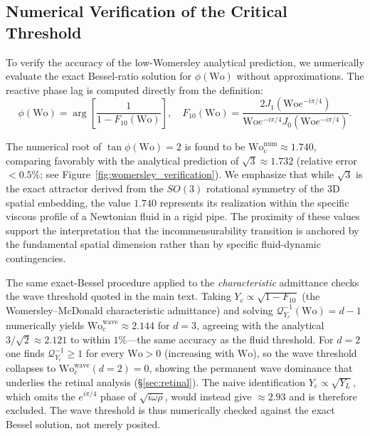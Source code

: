 \documentclass[11pt,a4paper]{article}
\theoremstyle{remark}
\begin{document}
\subsection{Numerical Verification of the Critical Threshold}

To verify the accuracy of the low-Womersley analytical prediction, we
numerically evaluate the exact Bessel-ratio solution for $\phi(\mathrm{Wo})$
without approximations. The reactive phase lag is computed directly from the
definition:
\begin{equation}
    \phi(\mathrm{Wo}) = \arg \left[ \frac{1}{1 - F_{10}(\mathrm{Wo})} \right], \quad F_{10}(\mathrm{Wo}) = \frac{2 J_1(\mathrm{Wo} e^{-i\pi/4})}{\mathrm{Wo} e^{-i\pi/4} J_0(\mathrm{Wo} e^{-i\pi/4})}.
\end{equation}

The numerical root of $\tan \phi(\mathrm{Wo}) = 2$ is found to be
$\mathrm{Wo}_c^{\text{num}} \approx 1.740$, comparing favorably with the
analytical prediction of $\sqrt{3} \approx 1.732$ (relative error $< 0.5\%$; see
Figure~\ref{fig:womersley_verification}). We emphasize that while $\sqrt{3}$ is
the exact attractor derived from the $SO(3)$ rotational symmetry of the 3D
spatial embedding, the value $1.740$ represents its realization within the
specific viscous profile of a Newtonian fluid in a rigid pipe. The proximity of
these values support the interpretation that the incommensurability
transition is anchored by the fundamental spatial dimension rather than by
specific fluid-dynamic contingencies.

The same exact-Bessel procedure applied to the \emph{characteristic}
admittance checks the wave threshold quoted in the main text. Taking $Y_c
\propto \sqrt{1-F_{10}}$ (the Womersley--McDonald characteristic admittance) and
solving $\mathcal{Q}^{-1}_{Y_c}(\mathrm{Wo}) = d-1$ numerically yields
$\mathrm{Wo}_c^{\mathrm{wave}} \approx 2.144$ for $d=3$, agreeing with the
analytical $3/\sqrt{2}\approx 2.121$ to within $1\%$---the same accuracy as the
fluid threshold. For $d=2$ one finds $\mathcal{Q}^{-1}_{Y_c}\ge 1$ for every
$\mathrm{Wo}>0$ (increasing with $\mathrm{Wo}$), so the wave threshold collapses
to $\mathrm{Wo}_c^{\mathrm{wave}}(d{=}2)=0$, showing the permanent wave
dominance that underlies the retinal analysis (\S\ref{sec:retinal}). The naive
identification $Y_c\propto\sqrt{Y_L}$, which omits the $e^{i\pi/4}$ phase of
$\sqrt{i\omega\rho}$, would instead give $\approx 2.93$ and is therefore
excluded. The wave threshold is thus numerically checked against the exact
Bessel solution, not merely posited.
\end{document}
